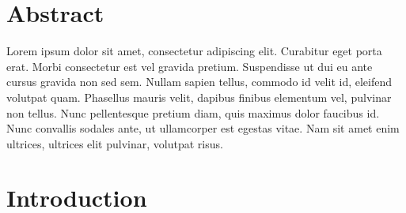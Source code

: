 \documentclass[10pt,letterpaper]{article}
\theoremstyle{definition}
\theoremstyle{remark}
\begin{document}
\section*{Abstract}
Lorem ipsum dolor sit amet, consectetur adipiscing elit. Curabitur eget porta erat. Morbi consectetur est vel gravida pretium. Suspendisse ut dui eu ante cursus gravida non sed sem. Nullam sapien tellus, commodo id velit id, eleifend volutpat quam. Phasellus mauris velit, dapibus finibus elementum vel, pulvinar non tellus. Nunc pellentesque pretium diam, quis maximus dolor faucibus id. Nunc convallis sodales ante, ut ullamcorper est egestas vitae. Nam sit amet enim ultrices, ultrices elit pulvinar, volutpat risus.



\linenumbers

\section*{Introduction}


\end{document}
